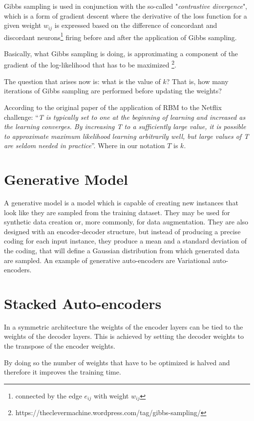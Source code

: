 \documentclass[a4paper]{article}
\begin{document}
Gibbs sampling is used in conjunction with the so-called "\textit{contrastive divergence}", which is a form of gradient descent where the derivative of the loss function for a given weight $w_{ij}$ is expressed based on the difference of concordant and discordant neurons\footnote{connected by the edge $e_{ij}$ with weight $w_{ij}$} firing before and after the application of Gibbs sampling.

Basically, what Gibbs sampling is doing, is approximating a component of the gradient of the log-likelihood that has to be maximized \footnote{https://theclevermachine.wordpress.com/tag/gibbs-sampling/}.

The question that arises now is: what is the value of $k$? That is, how many iterations of Gibbs sampling are performed before updating the weights?

According to the original paper of the application of RBM to the Netflix challenge\cite{RBMNetflix}: ``\textit{T is typically
set to one at the beginning of learning and increased
as the learning converges.  By increasing T
to a sufficiently large value, it is possible to approximate
maximum likelihood learning arbitrarily well, but large values
of T are seldom needed in practice}''. Where in our notation $T$ is $k$.

\section{Generative Model}
A generative model is a model which is capable of creating new instances that look like they are sampled from the training dataset. They may be used for synthetic data creation or, more commonly, for data augmentation. They are also designed with an encoder-decoder structure, but instead of producing a precise coding for each input instance, they produce a mean and a standard deviation of the coding, that will define a Gaussian distribution from which generated data are sampled. An example of generative auto-encoders are Variational auto-encoders. 

\section{Stacked Auto-encoders}
In a symmetric architecture the weights of the encoder layers can be tied to the weights of the decoder layers. This is achieved by setting the decoder weights to the transpose of the encoder weights.

By doing so the number of weights that have to be optimized is halved and therefore it improves the training time.


{}

\end{document}
